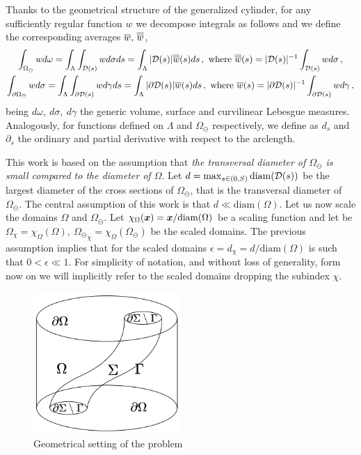 \documentclass[r]{siamart171218}
\begin{document}
Thanks to the  geometrical structure of the generalized cylinder, 
for any sufficiently regular function $w$ we decompose integrals as follows
and we define the corresponding averages $\overline{w},\,\overline{\overline{w}}$,
\begin{gather*}
\int_{\Omega_{\ominus}} w d\omega 
= \int_\Lambda \int_{\mathcal{D}(s)} w d\sigma ds
= \int_\Lambda |\mathcal{D}(s)|\overline{\overline{w}}(s) ds\,,
\ \textrm{where} \ \overline{\overline{w}}(s) = |\mathcal{D}(s)|^{-1} \int_{\mathcal{D}(s)} w d\sigma\,,
\\
\int_{\partial\Omega_{\ominus}} w d\sigma 
= \int_\Lambda \int_{\partial\mathcal{D}(s)} w d\gamma ds
= \int_\Lambda  |\partial \mathcal{D}(s)| \overline{w}(s) ds\,,
\ \textrm{where} \ \overline{w}(s) = |\partial\mathcal{D}(s)|^{-1} \int_{\partial\mathcal{D}(s)} w d\gamma\,,
\end{gather*}
being $d\omega, \ d\sigma, \ d\gamma$ the generic volume, surface and curvilinear Lebesgue measures.
Analogously, for functions defined on $\Lambda$ and $\Omega_\ominus$ respectively, 
we define as $d_s$ and $\partial_s$ the ordinary and partial derivative with respect to the arclength.

This work is based on the assumption that \emph{the transversal diameter of $\Omega_{\ominus}$ is small compared to the diameter of $\Omega$}. 
Let $d= \max_{s \in (0,S)} \mathrm{diam}(\mathcal{D}(s))$ be the largest diameter of the cross sections of $\Omega_{\ominus}$, that is the transversal diameter of $\Omega_{\ominus}$.
The central assumption of this work is that $d \ll \mathrm{diam}(\Omega)$.
Let us now scale the domains $\Omega$ and $\Omega_{\ominus}$.
Let $\chi_{\Omega}(\boldsymbol x) = \boldsymbol x / \mathrm{diam}(\Omega)$ be a scaling function and let be $\Omega_\chi = \chi_{\Omega}(\Omega), \ {\Omega_{\ominus}}_\chi =  \chi_{\Omega}(\Omega_{\ominus})$ be the scaled domains. The previous assumption implies that for the scaled domains $\epsilon = d_\chi = d/\mathrm{diam}(\Omega)$
is such that $0 < \epsilon \ll 1$. For simplicity of notation, and without loss of generality, form now on we will implicitly refer to the scaled domains dropping the subindex $\chi$.

\begin{figure}
\begin{center}
\includegraphics[width=0.5\textwidth]{3D-1D-simple.png}
\end{center}
\caption{Geometrical setting of the problem}
\label{fig1}
\end{figure}
\end{document}
